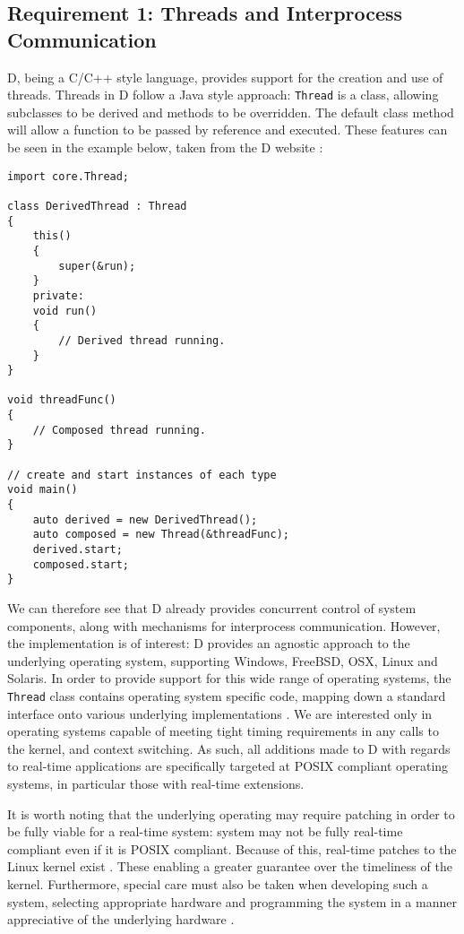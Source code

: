 \subsection{Requirement 1: Threads and Interprocess Communication}
D, being a C/C++ style language, provides support for the creation and use of 
threads. Threads in D follow a Java style approach: \texttt{Thread} is a class, 
allowing subclasses to be derived and methods to be overridden. The default 
class method will allow a function to be passed by reference and executed. 
These features can be seen in the example below, taken from the D website
\cite{core-thread}: 
\begin{lstlisting}
import core.Thread; 

class DerivedThread : Thread
{
    this()
    {
        super(&run);
    }
    private:
    void run()
    {
        // Derived thread running.
    }
}

void threadFunc()
{
    // Composed thread running.
}

// create and start instances of each type
void main()
{
    auto derived = new DerivedThread();
    auto composed = new Thread(&threadFunc);
    derived.start; 
    composed.start;
}
\end{lstlisting}
We can therefore see that D already provides 
concurrent control of system components, along with mechanisms for 
interprocess communication. However, the implementation is of interest: D 
provides an agnostic approach to the underlying operating system, supporting 
Windows, FreeBSD, OSX, Linux and Solaris. 
In order to provide support for this wide range of operating systems, the 
\texttt{Thread}
class contains operating system specific code, mapping down a standard interface 
onto various underlying implementations 
\cite{github-core-thread}. 
We are interested only in operating systems capable of meeting tight timing 
requirements in any calls to the kernel, and context switching.
As such, all additions made to D with regards to real-time applications are 
specifically targeted at POSIX compliant 
operating systems, in particular those with real-time extensions. 
\par\bigskip\noindent
It is worth noting that the underlying operating may require patching in order 
to be fully viable for a real-time system: system may not be fully
real-time compliant even if it is POSIX compliant. Because of this, real-time patches 
to the Linux kernel exist \cite{rt-wiki}. These enabling a greater 
guarantee over the timeliness of the kernel. 
Furthermore, special care must also be taken when developing such a system,
selecting appropriate hardware and programming the system in a manner appreciative 
of the underlying hardware \cite{rt-wiki-how-to}.

